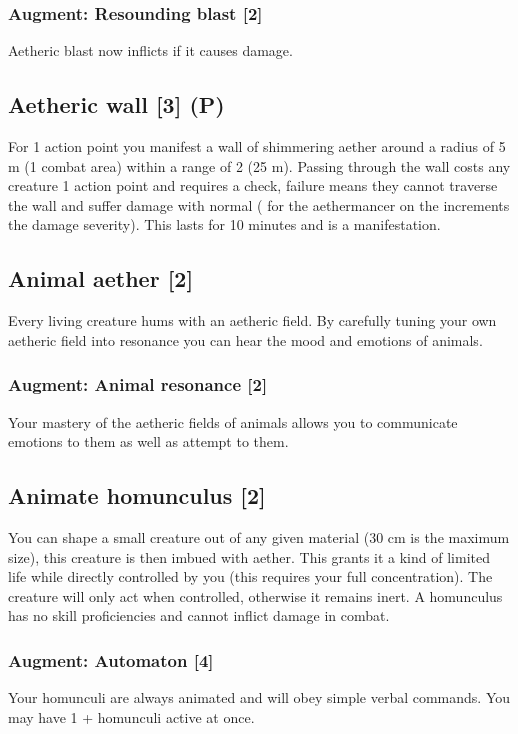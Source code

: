 \subsubsection{Augment: Resounding blast [2]}
Aetheric blast now inflicts  if it causes damage.


\subsection{Aetheric wall [3] (P)}
For 1 action point you manifest a wall of shimmering aether around a radius of 5 m (1 combat area) within a range of 2 (25 m). Passing through the wall costs any creature 1 action point and requires a  check, failure means they cannot traverse the wall and suffer damage with normal  ( for the aethermancer on the  increments the damage severity). This lasts for 10 minutes and is a  manifestation.


\subsection{Animal aether [2]}
Every living creature hums with an aetheric field. By carefully tuning your own aetheric field into resonance you can hear the mood and emotions of animals.
\subsubsection{Augment: Animal resonance [2]}
Your mastery of the aetheric fields of animals allows you to communicate emotions to them as well as attempt to  them.


\subsection{Animate homunculus [2]}
You can shape a small creature out of any given material (30 cm is the maximum size), this creature is then imbued with aether. This grants it a kind of limited life while directly controlled by you (this requires your full concentration). The creature will only act when controlled, otherwise it remains inert. A homunculus has no skill proficiencies and cannot inflict damage in combat.
\subsubsection{Augment: Automaton [4]}
Your homunculi are always animated and will obey simple verbal commands. You may have 1 +  homunculi active at once. 
